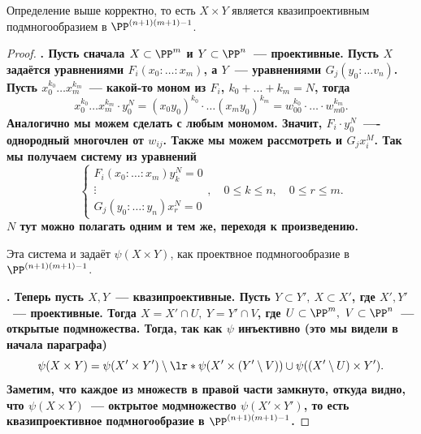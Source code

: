  	\begin{statement} 
 		Определение выше корректно, то есть $X \times Y$ является квазипроективным подмногообразием в $\PP^{(n + 1)(m + 1) - 1}$.
 	\end{statement}
 	\begin{proof}
 		\bf{. } Пусть сначала $X \subset \PP^m$ и $Y \subset \PP^n$~--- проективные. Пусть $X$ задаётся уравнениями $F_{i}(x_0 : \ldots : x_m)$, а $Y$~--- уравнениями $G_{j}(y_0 : \ldots v_n)$. Пусть $x_0^{k_0} \ldots x_m^{k_m}$~--- какой-то моном из $F_i$, $k_0 + \ldots + k_m = N$, тогда 
 		\[
 			x_0^{k_0} \ldots x_m^{k_m} \cdot y_0^N = (x_0 y_0)^{k_0} \cdot \ldots (x_m y_0)^{k_m} = w_{00}^{k_0} \cdot \ldots \cdot w_{m 0}^{k_m}.
 		\]
 		Аналогично мы можем сделать с любым мономом. Значит, $F_i \cdot y_0^N$~---- однородный многочлен от $w_{i j}$. Также мы можем рассмотреть и $G_{j} x_i^{M}$. Так мы получаем систему из уравнений 
 		\[
 			\begin{cases}  F_i(x_0 : \ldots : x_m) y_k^N = 0 \\ \vdots \\ G_j(y_0 : \ldots : y_n) x_r^N = 0 \end{cases}, \quad 0 \le k \le n, \quad 0 \le r \le m.
 		\]
 		$N$ тут можно полагать одним и тем же, переходя к произведению. 

 		Эта система и задаёт $\psi(X \times Y)$, как проектвное подмногообразие в $\PP^{(n + 1)(m + 1) - 1}$.

 		\bf{.} Теперь пусть $X, Y$~--- квазипроективные. Пусть $Y \subset Y', \ X \subset X'$, где $X', Y'$~--- проективные. Тогда $X = X' \cap U, \ Y = Y' \cap V$, где $U \subset \PP^m, \ V \subset \PP^n$~--- открытые подмножества. Тогда, так как $\psi$ инъективно (это мы видели в начала параграфа) 
 		\[
 			\psi(X \times Y) = \psi(X' \times Y') \setminus \lr*{\psi(X' \times (Y' \setminus V)) \cup \psi((X' \setminus U) \times Y') }.
 		\]
 		Заметим, что каждое из множеств в правой части замкнуто, откуда видно, что $\psi(X \times Y)$~--- октрытое модмножество $\psi(X' \times Y')$, то есть квазипроективное подмногообразие в $\PP^{(n + 1)(m + 1) - 1}$.
 	\end{proof}

